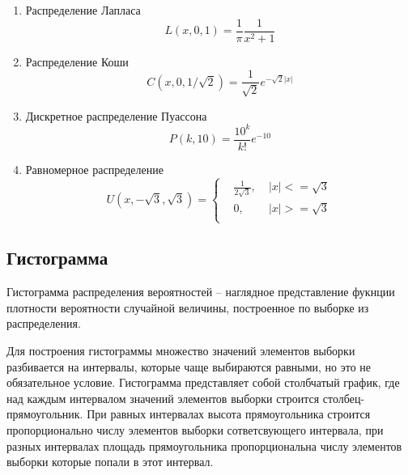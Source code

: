 \documentclass[12pt]{article}
\begin{document}
\begin{flushleft}
\begin{enumerate}
            \item Распределение Лапласа
            \begin{equation}
                L(x, 0, 1) = \frac{1}{\pi}\frac{1}{x^2 + 1}
                \label{laplace}
            \end{equation}

            \item Распределение Коши
            \begin{equation}
                C(x, 0, 1/\sqrt{2}) =\frac{1}{\sqrt{2}} e^{-\sqrt{2}|x|}
                \label{cauchy}
            \end{equation}

            \item Дискретное распределение Пуассона
            \begin{equation}
                P(k, 10) = \frac{10^k}{k!} e^{-10}
                \label{poisson}
            \end{equation}

            \item Равномерное распределение
            \begin{equation}
                U(x, -\sqrt{3}, \sqrt{3}) = 
                \left\{
                \begin{aligned}
                    & \frac{1}{2\sqrt{3}},& \; |x| <= \sqrt{3}\\
                    & 0,                  & \; |x| >= \sqrt{3}\\
                \end{aligned}
                \right.
                \label{uniform}
            \end{equation}
        \end{enumerate}

    \subsection{Гистограмма}

        Гистограмма распределения вероятностей -- наглядное представление фукнции плотности вероятности случайной величины, построенное по выборке из распределения.

        Для построения гистограммы множество значений элементов выборки разбивается на интервалы, которые чаще выбираются равными, но это не обязательное условие. Гистограмма представляет собой столбчатый график, где над каждым интервалом значений элементов выборки строится столбец-прямоугольник.  При равных интервалах высота прямоугольника строится пропорционально числу элементов выборки сответсвующего интервала, при разных интервалах площадь прямоугольника пропорциональна числу элементов выборки которые попали в этот интервал.


\end{flushleft}
\end{document}
